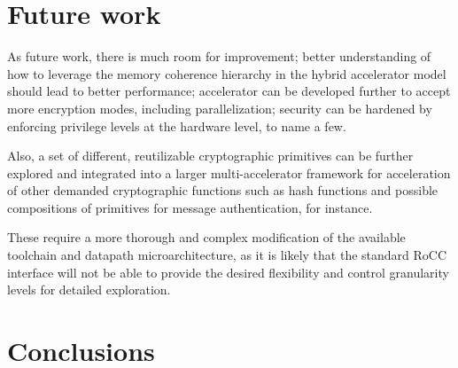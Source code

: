 \documentclass[10pt,conference]{IEEEtran}
\begin{document}
\section{Future work}

As future work, there is much room for improvement; better understanding of how
to leverage the memory coherence hierarchy in the hybrid accelerator model
should lead to better performance; accelerator can be developed further to
accept more encryption modes, including parallelization; security can be
hardened by enforcing privilege levels at the hardware level, to name a few.

Also, a set of different, reutilizable cryptographic primitives can be further
explored and integrated into a larger multi-accelerator framework for
acceleration of other demanded cryptographic functions such as hash functions
and possible compositions of primitives for message authentication, for instance.

These require a more thorough and complex modification of the available
toolchain and datapath microarchitecture, as it is likely that the standard RoCC
interface will not be able to provide the desired flexibility and control
granularity levels for detailed exploration.

\section{Conclusions}



\end{document}
